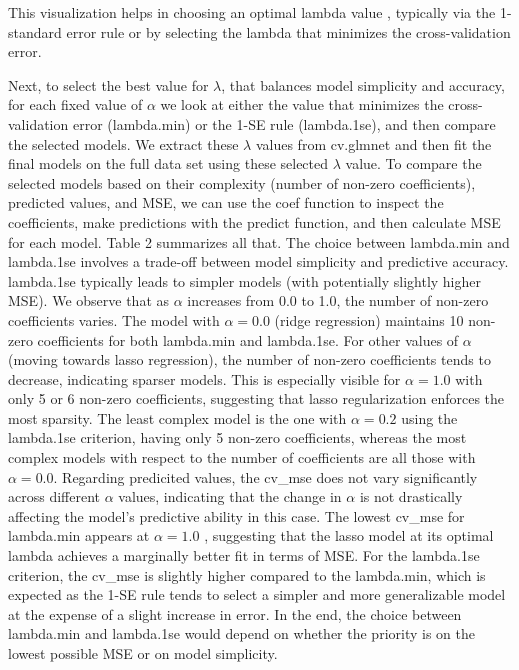 \documentclass[
]{article}
\begin{document}
This visualization helps in choosing an optimal lambda value , typically
via the 1-standard error rule or by selecting the lambda that minimizes
the cross-validation error.

Next, to select the best value for \(\lambda\), that balances model
simplicity and accuracy, for each fixed value of \(\alpha\) we look at
either the value that minimizes the cross-validation error (lambda.min)
or the 1-SE rule (lambda.1se), and then compare the selected models. We
extract these \(\lambda\) values from cv.glmnet and then fit the final
models on the full data set using these selected \(\lambda\) value. To
compare the selected models based on their complexity (number of
non-zero coefficients), predicted values, and MSE, we can use the coef
function to inspect the coefficients, make predictions with the predict
function, and then calculate MSE for each model. Table 2 summarizes all
that. The choice between lambda.min and lambda.1se involves a trade-off
between model simplicity and predictive accuracy. lambda.1se typically
leads to simpler models (with potentially slightly higher MSE). We
observe that as \(\alpha\) increases from 0.0 to 1.0, the number of
non-zero coefficients varies. The model with \(\alpha = 0.0\) (ridge
regression) maintains 10 non-zero coefficients for both lambda.min and
lambda.1se. For other values of \(\alpha\) (moving towards lasso
regression), the number of non-zero coefficients tends to decrease,
indicating sparser models. This is especially visible for
\(\alpha = 1.0\) with only 5 or 6 non-zero coefficients, suggesting that
lasso regularization enforces the most sparsity. The least complex model
is the one with \(\alpha = 0.2\) using the lambda.1se criterion, having
only 5 non-zero coefficients, whereas the most complex models with
respect to the number of coefficients are all those with
\(\alpha = 0.0\). Regarding predicited values, the cv\_mse does not vary
significantly across different \(\alpha\) values, indicating that the
change in \(\alpha\) is not drastically affecting the model's predictive
ability in this case. The lowest cv\_mse for lambda.min appears at
\(\alpha = 1.0\) , suggesting that the lasso model at its optimal lambda
achieves a marginally better fit in terms of MSE. For the lambda.1se
criterion, the cv\_mse is slightly higher compared to the lambda.min,
which is expected as the 1-SE rule tends to select a simpler and more
generalizable model at the expense of a slight increase in error. In the
end, the choice between lambda.min and lambda.1se would depend on
whether the priority is on the lowest possible MSE or on model
simplicity.
\end{document}
